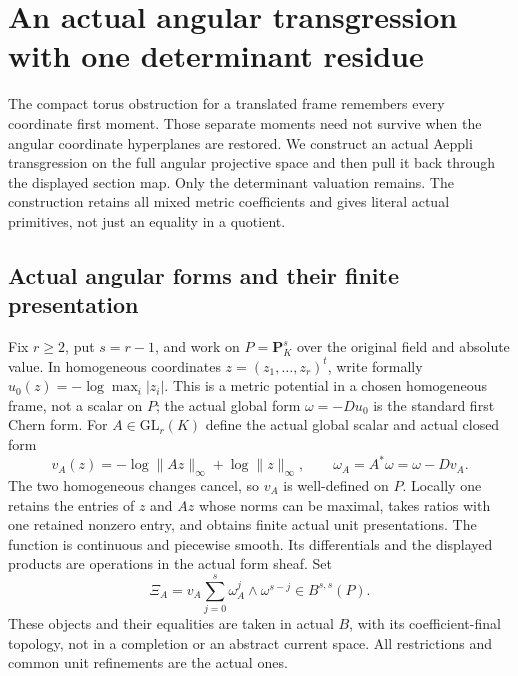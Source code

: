 \section{An actual angular transgression with one determinant residue}
\label{sec:r9-angular-aeppli-transgression}

The compact torus obstruction for a translated frame remembers
every coordinate first moment.  Those separate moments need not
survive when the angular coordinate hyperplanes are restored.
We construct an actual Aeppli transgression on the full angular
projective space and then pull it back through the displayed
section map.  Only the determinant valuation remains.  The
construction retains all mixed metric coefficients and gives
literal actual primitives, not just an equality in a quotient.

\subsection{Actual angular forms and their finite presentation}

Fix $r\ge2$, put $s=r-1$, and work on $P=\mathbf P^{s}_K$
over the original field and absolute value.  In homogeneous
coordinates $z=(z_1,\ldots,z_r)^t$, write formally
$u_0(z)=-\log\max_i|z_i|$.  This is a metric potential in
a chosen homogeneous frame, not a scalar on $P$; the actual
global form $\omega=-Du_0$ is the standard first Chern form.
For $A\in\mathrm{GL}_r(K)$ define the actual global scalar
and actual closed form
\[
 v_A(z)=-\log\|Az\|_\infty+\log\|z\|_\infty,
       \qquad \omega_A=A^*\omega=\omega-Dv_A.
 \tag{AAT1}
\]
The two homogeneous changes cancel, so $v_A$ is well-defined
on $P$.  Locally one retains the entries of $z$ and $Az$
whose norms can be maximal, takes ratios with one retained
nonzero entry, and obtains finite actual unit presentations.
The function is continuous and piecewise smooth.  Its
differentials and the displayed products are operations in
the actual form sheaf.  Set
\[
 \Xi_A=v_A\sum_{j=0}^{s}\omega_A^j\wedge\omega^{s-j}
                     \in B^{s,s}(P).
 \tag{AAT2}
\]
These objects and their equalities are taken in actual $B$,
with its coefficient-final topology, not in a completion or
an abstract current space.  All restrictions and common unit
refinements are the actual ones.

